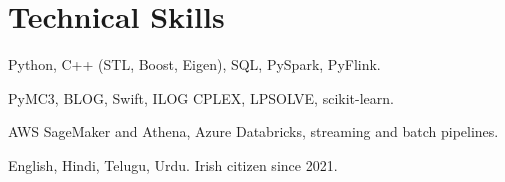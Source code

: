 \documentclass[9pt,letterpaper]{extarticle}
\begin{document}
\section{Technical Skills}
\begin{description}[leftmargin=0.82in, style=sameline,
                    font={\small\bfseries\color{accent}},
                    topsep=3pt, itemsep=2pt, parsep=0pt]
  \item[Programming] Python, C++ (STL, Boost, Eigen), SQL, PySpark, PyFlink.
  \item[Modelling] PyMC3, BLOG, Swift, ILOG CPLEX, LPSOLVE, scikit-learn.
  \item[Platforms] AWS SageMaker and Athena, Azure Databricks, streaming and batch pipelines.
  \item[Languages] English, Hindi, Telugu, Urdu. Irish citizen since 2021.
\end{description}
\end{document}
